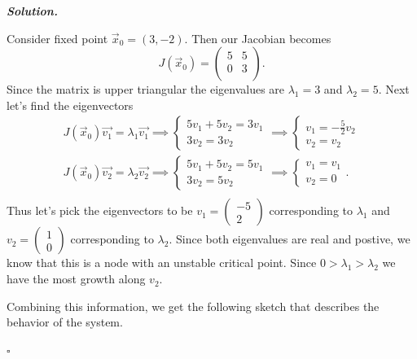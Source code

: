 \documentclass[12pt]{report}
\newenvironment{solution}[1][\it{Solution}]{\textbf{#1. } }{$\square$}
\begin{document}
\begin{solution}
    
    \noindent 
    Consider fixed point $\vec{x}_0 = (3,-2)$. Then our Jacobian becomes
    \[ J(\vec{x}_0) = \left(
        \begin{array}{cc}
         5 & 5 \\
         0 & 3 \\
        \end{array}
        \right).
    \]
    Since the matrix is upper triangular the eigenvalues are $\lambda_1 = 3$ and $\lambda_2 = 5$. Next let's find the eigenvectors
    \begin{align*}
        J(\vec{x}_0)\vec{v_1} = \lambda_1 \vec{v_1} \implies \begin{cases}
            5v_1 + 5v_2 = 3v_1\\
            3v_2 = 3v_2
        \end{cases} \implies
        \begin{cases}
            v_1 = -\frac{5}{2}v_2\\
            v_2 = v_2
        \end{cases}\\
        J(\vec{x}_0)\vec{v_2} = \lambda_2 \vec{v_2} \implies \begin{cases}
            5v_1 + 5v_2 = 5v_1\\
            3v_2 = 5v_2
        \end{cases} \implies
        \begin{cases}
            v_1 = v_1\\
            v_2 = 0
        \end{cases}.\\
    \end{align*}
    Thus let's pick the eigenvectors to be $v_1 = \begin{pmatrix}
        -5\\2
    \end{pmatrix}$ corresponding to $\lambda_1$ and $v_2 = \begin{pmatrix}
        1\\0
    \end{pmatrix}$ corresponding to $\lambda_2$. Since both eigenvalues are real and postive, we know that this is a node with an unstable critical point. Since $0 > \lambda_1 > \lambda_2$ we have the most growth along $v_2$.

    \noindent
    Combining this information, we get the following sketch that describes the behavior of the system. 
    

\end{solution}
\end{document}
